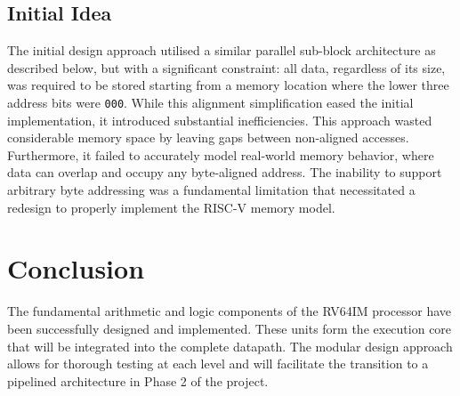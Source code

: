 \documentclass{article}
\begin{document}
\subsection*{Initial Idea}
The initial design approach utilised a similar parallel sub-block architecture as described below, but with a significant constraint: all data, regardless of its size, was required to be stored starting from a memory location where the lower three address bits were \texttt{000}. While this alignment simplification eased the initial implementation, it introduced substantial inefficiencies. This approach wasted considerable memory space by leaving gaps between non-aligned accesses. Furthermore, it failed to accurately model real-world memory behavior, where data can overlap and occupy any byte-aligned address. The inability to support arbitrary byte addressing was a fundamental limitation that necessitated a redesign to properly implement the RISC-V memory model.

\section*{Conclusion}

The fundamental arithmetic and logic components of the RV64IM processor have been successfully designed and implemented. These units form the execution core that will be integrated into the complete datapath. The modular design approach allows for thorough testing at each level and will facilitate the transition to a pipelined architecture in Phase 2 of the project.
\end{document}

